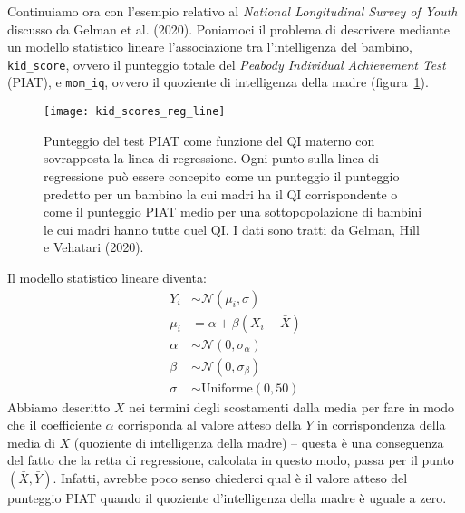 Continuiamo ora con l'esempio relativo al \emph{National Longitudinal Survey of Youth} discusso da Gelman et al. (2020). 
Poniamoci il problema di descrivere mediante un modello statistico lineare  l'associazione tra l'intelligenza del bambino, \texttt{kid\_score}, ovvero il punteggio totale del \emph{Peabody Individual Achievement Test} (PIAT), e \texttt{mom\_iq}, ovvero il quoziente di intelligenza della madre (figura~\ref{fig:kid_scores_reg_line}). 

\begin{figure} %
 \centering
 \texttt{[image: kid\_scores\_reg\_line]}
 \caption{Punteggio del test PIAT come funzione del QI materno con sovrapposta la linea di regressione. Ogni punto sulla linea di regressione può essere concepito come un punteggio il punteggio predetto per un bambino la cui madri ha il QI corrispondente o come il punteggio PIAT medio per una sottopopolazione di bambini le cui madri hanno tutte quel QI.
I dati sono tratti da Gelman, Hill e Vehatari (2020). 
}
\label{fig:kid_scores_reg_line}
\end{figure}

Il modello statistico lineare diventa:
\begin{align}
Y_i &\sim \mathcal{N}(\mu_i, \sigma) \tag*{[verosimiglianza]}\\
\mu_i &= \alpha + \beta(X_i - \bar{X}) \tag*{[modello lineare]}\\
\alpha &\sim \mathcal{N}(0, \sigma_{\alpha}) \tag*{[distr. a priori per $\alpha$]}\\
\beta &\sim \mathcal{N}(0, \sigma_{\beta}) \tag*{[distr. a priori per $\beta$]}\\
\sigma &\sim \text{Uniforme}(0, 50) \tag*{[distr. a priori per $\sigma$]}
\end{align}
Abbiamo descritto $X$ nei termini degli scostamenti dalla media per fare in modo che il coefficiente $\alpha$ corrisponda al valore atteso della $Y$ in corrispondenza della media di $X$ (quoziente di intelligenza della madre) -- questa è una conseguenza del fatto che la retta di regressione, calcolata in questo modo, passa per il punto $(\bar{X}, \bar{Y})$.
Infatti, avrebbe poco senso chiederci qual è il valore atteso del punteggio PIAT quando il quoziente d'intelligenza della madre è uguale a zero.



